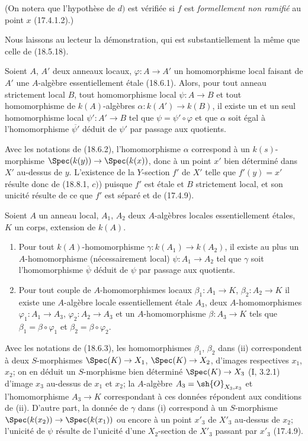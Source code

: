 
(On notera que l'hypothèse de $d)$ est vérifiée si $f$ est \emph{formellement non ramifié} au point $x$ (17.4.1.2).)

Nous laissons au lecteur la démonstration, qui est substantiellement la même que celle de (18.5.18).

\begin{lemma}[18.8.4]
\label{IV.18.8.4}
Soient $A$, $A'$ deux anneaux locaux, $\varphi:A\to A'$ un homomorphisme local faisant de $A'$ une $A$-algèbre essentiellement étale (18.6.1). Alors, pour tout anneau strictement local $B$, tout homomorphisme local $\psi:A\to B$ et tout homomorphisme de $k(A)$-algèbres $\alpha:k(A')\to k(B)$, il existe un et un seul homomorphisme local $\psi':A'\to B$ tel que $\psi=\psi'\circ\varphi$ et que $\alpha$ soit égal à l'homomorphisme $\overline{\psi'}$ déduit de $\psi'$ par passage aux quotients.
\end{lemma}

Avec les notations de (18.6.2), l'homomorphisme $\alpha$ correspond à un $k(s)$-morphisme $\Spec(k(y))\to\Spec(k(x))$, donc à un point $x'$ bien déterminé dans $X'$ au-dessus de $y$. L'existence de la $Y$-section $f'$ de $X'$ telle que $f'(y)=x'$ résulte donc de (18.8.1, $c)$) puisque $f'$ est étale et $B$ strictement local, et son unicité résulte de ce que $f'$ est séparé et de (17.4.9).

\begin{lemma}[18.8.5]
\label{IV.18.8.5}
Soient $A$ un anneau local, $A_1$, $A_2$ deux $A$-algèbres locales essentiellement étales, $K$ un corps, extension de $k(A)$.
\begin{enumerate}
  \item[(i)] Pour tout $k(A)$-homomorphisme $\gamma:k(A_1)\to k(A_2)$, il existe au plus un $A$-homomorphisme (nécessairement local) $\psi:A_1\to A_2$ tel que $\gamma$ soit l'homomorphisme $\overline\psi$ déduit de $\psi$ par passage aux quotients.
  \item[(ii)] Pour tout couple de $A$-homomorphismes locaux $\beta_1:A_1\to K$, $\beta_2:A_2\to K$ il existe une $A$-algèbre locale essentiellement étale $A_3$, deux $A$-homomorphismes $\varphi_1:A_1\to A_3$, $\varphi_2:A_2\to A_3$ et un $A$-homomorphisme $\beta:A_3\to K$ tels que $\beta_1=\beta\circ\varphi_1$ et $\beta_2=\beta\circ\varphi_2$.
\end{enumerate}
\end{lemma}

Avec les notations de (18.6.3), les homomorphismes $\beta_1$, $\beta_2$ dans (ii) correspondent à deux $S$-morphismes $\Spec(K)\to X_1$, $\Spec(K)\to X_2$, d'images respectives $x_1$, $x_2$; on en déduit un $S$-morphisme bien déterminé $\Spec(K)\to X_3$ (I, 3.2.1) d'image $x_3$ au-dessus de $x_1$ et $x_2$; la $A$-algèbre $A_3=\sh{O}_{X_3,x_3}$ et l'homomorphisme $A_3\to K$ correspondant à ces données répondent aux conditions de (ii). D'autre part, la donnée de $\gamma$ dans (i) correspond à un $S$-morphisme $\Spec(k(x_2))\to\Spec(k(x_1))$ ou encore à un point $x'_3$ de $X'_3$ au-dessus de $x_2$; l'unicité de $\psi$ résulte de l'unicité d'une $X_2$-section de $X'_3$ passant par $x'_3$ (17.4.9).

